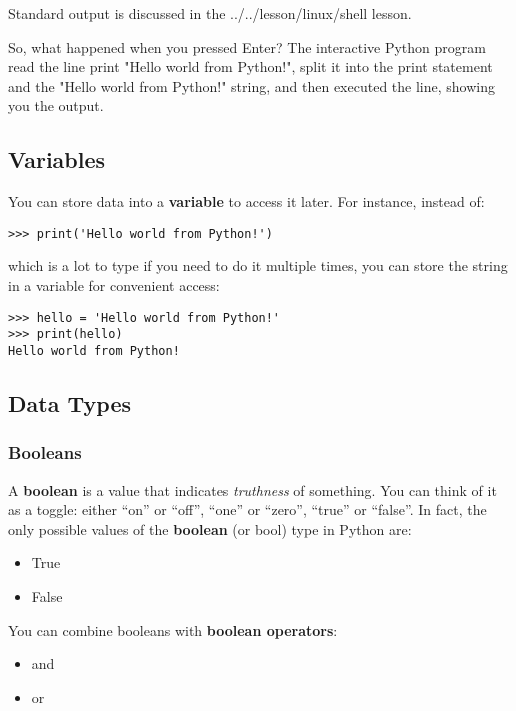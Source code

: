 Standard output is discussed in the ../../lesson/linux/shell lesson.

So, what happened when you pressed Enter? The interactive Python program
read the line print "Hello world from Python!", split it into the print
statement and the "Hello world from Python!" string, and then executed
the line, showing you the output.

\subsection{Variables}\label{variables}

You can store data into a \textbf{variable} to access it later. For
instance, instead of:

\begin{verbatim}
>>> print('Hello world from Python!')
\end{verbatim}

which is a lot to type if you need to do it multiple times, you can
store the string in a variable for convenient access:

\begin{verbatim}
>>> hello = 'Hello world from Python!'
>>> print(hello)
Hello world from Python!
\end{verbatim}

\subsection{Data Types}\label{data-types}

\subsubsection{Booleans}\label{booleans}

A \textbf{boolean} is a value that indicates \emph{truthness} of
something. You can think of it as a toggle: either ``on'' or ``off'',
``one'' or ``zero'', ``true'' or ``false''. In fact, the only possible
values of the \textbf{boolean} (or bool) type in Python are:

\begin{itemize}

\item
  True
\item
  False
\end{itemize}

You can combine booleans with \textbf{boolean operators}:

\begin{itemize}

\item
  and
\item
  or
\end{itemize}

